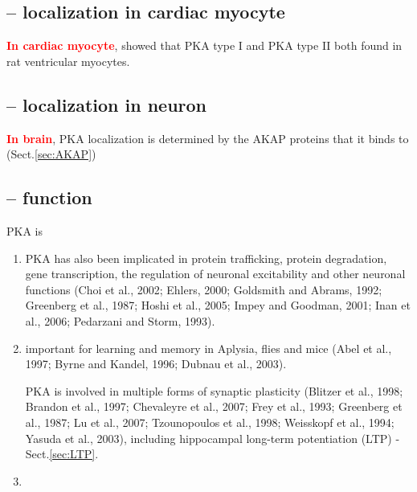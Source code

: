 \subsection{-- localization in cardiac myocyte}
\label{sec:PKA-localization-cardiac}

\textcolor{red}{\bf In cardiac myocyte}, \citep{Yang1998} showed that PKA type I
and PKA type II both found in rat ventricular myocytes.

\subsection{-- localization in neuron}
\label{sec:PKA-localization-neuron}

\textcolor{red}{\bf In brain}, 
PKA localization is determined by the AKAP proteins that it binds to
(Sect.\ref{sec:AKAP})

\subsection{-- function}
\label{sec:PKA-function}

PKA is  
\begin{enumerate}
  \item  PKA has also been implicated in protein trafficking, protein
  degradation, gene transcription, the regulation of neuronal excitability and
  other neuronal functions (Choi et al., 2002; Ehlers, 2000; Goldsmith and
  Abrams, 1992; Greenberg et al., 1987; Hoshi et al., 2005; Impey and Goodman,
  2001; Inan et al., 2006; Pedarzani and Storm, 1993).   
  
   \item important for learning and memory in Aplysia, flies and mice (Abel et
   al., 1997; Byrne and Kandel, 1996; Dubnau et al., 2003).

PKA is involved in multiple forms of synaptic plasticity (Blitzer et al., 1998;
Brandon et al., 1997; Chevaleyre et al., 2007; Frey et al., 1993; Greenberg et
al., 1987; Lu et al., 2007; Tzounopoulos et al., 1998; Weisskopf et al., 1994;
Yasuda et al., 2003), including hippocampal long-term potentiation (LTP) -
Sect.\ref{sec:LTP}.

  \item 
\end{enumerate}

